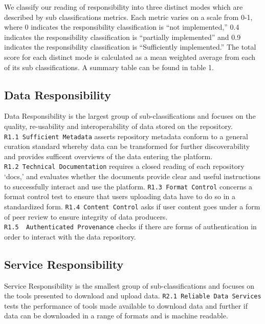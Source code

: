 \documentclass{article}
\begin{document}
We classify our reading of responsibility into three distinct modes
which are described by sub classifications metrics. Each metric varies
on a scale from 0-1, where 0 indicates the responsibility classification
is ``not implemented,'' 0.4 indicates the responsibility classification
is ``partially implemented'' and 0.9 indicates the responsibility
classification is ``Sufficiently implemented.'' The total score for each
distinct mode is calculated as a mean weighted average from each of its
sub classifications. A summary table can be found in table 1.

\hypertarget{data-responsibility}{%
\subsection{Data Responsibility}\label{data-responsibility}}

Data Responsibility is the largest group of sub-classifications and
focuses on the quality, re-usability and interoperability of data stored
on the repository. \texttt{R1.1\ Sufficient\ Metadata} asserts
repository metadata conform to a general curation standard whereby data
can be transformed for further discoverability and provides sufficent
overviews of the data entering the platform.
\texttt{R1.2\ Technical\ Documentation} requires a closed reading of
each repository `docs,' and evaluates whether the documents provide
clear and useful instructions to successfully interact and use the
platform. \texttt{R1.3\ Format\ Control} concerns a format control test
to ensure that users uploading data have to do so in a standardized
form. \texttt{R1.4\ Content\ Control} asks if user content goes under a
form of peer review to ensure integrity of data producers.
\texttt{R1.5\ \ Authenticated\ Provenance} checks if there are forms of
authentication in order to interact with the data repository.

\hypertarget{service-responsibility}{%
\subsection{Service Responsibility}\label{service-responsibility}}

Service Responsibility is the smallest group of sub-classifications and
focuses on the tools presented to download and upload data.
\texttt{R2.1\ Reliable\ Data\ Services} tests the performance of tools
made available to download data and further if data can be downloaded in
a range of formats and is machine readable.
\end{document}
